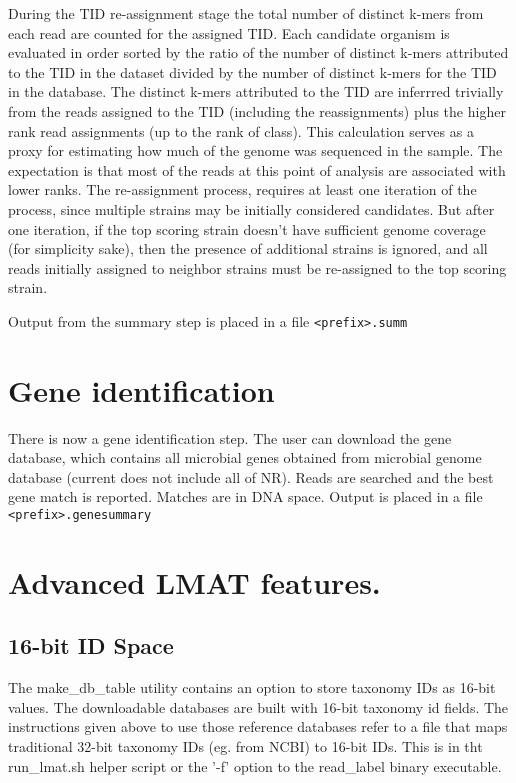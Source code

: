 \documentclass[11pt]{article}
\begin{document}
 
During the TID re-assignment stage the total number of distinct k-mers from each read are counted for the assigned TID. Each candidate organism is evaluated in order sorted by the ratio of the number of distinct k-mers attributed to the TID in the dataset divided by the number of distinct k-mers for the TID in the database. The distinct k-mers attributed to the TID are inferrred trivially from the reads assigned to the TID (including the reassignments) plus the higher rank read assignments (up to the rank of class). This calculation serves as a proxy for estimating how much of the genome was sequenced in the sample. The expectation is that most of the reads at this point of analysis are associated with lower ranks. The re-assignment process, requires at least one iteration of the process, since multiple strains may be initially considered candidates. But after one iteration, if the top scoring strain doesn't have sufficient genome coverage (for simplicity sake), then the presence of additional strains is ignored, and all reads initially assigned to neighbor strains must be re-assigned to the top scoring strain.

Output from the summary step is placed in a file \texttt{<prefix>.summ}

\section{Gene identification}

There is now a gene identification step.  The user can download the gene database, which contains all microbial genes obtained from microbial genome database (current does not include all of NR). Reads are searched and the best gene match is reported.  Matches are in DNA space. Output is placed in a file \texttt{<prefix>.genesummary}

\section{Advanced LMAT features.}

\subsection{16-bit ID Space}

The make\_db\_table utility contains an option to store taxonomy IDs as 16-bit values.  The downloadable databases are built with 16-bit taxonomy id fields.  The instructions given above to use those reference databases refer to a file that maps traditional 32-bit taxonomy IDs (eg. from NCBI) to 16-bit IDs.  This is in tht run\_lmat.sh helper script or the '-f' option to the read\_label binary executable.
\end{document}

